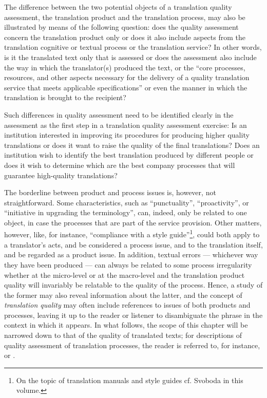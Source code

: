\documentclass[output=paper]{langsci/langscibook}
\begin{document}
The difference between the two potential objects of a translation quality assessment, the translation product and the translation process, may also be illustrated by means of the following question: does the quality assessment concern the translation product only or does it also include aspects from the translation cognitive or textual process or the translation service? In other words, is it the translated text only that is assessed or does the assessment also include the way in which the translator(s) produced the text, or the ``core processes, resources, and other aspects necessary for the delivery of a quality translation service that meets applicable specifications'' \citep{ISO2015} or even the manner in which the translation is brought to the recipient? 

Such differences in quality assessment need to be identified clearly in the assessment as the first step in a translation quality assessment exercise: Is an institution interested in improving its procedures for producing higher quality translations or does it want to raise the quality of the final translations? Does an institution wish to identify the best translation produced by different people or does it wish to determine which are the best company processes that will guarantee high-quality translations?

The borderline between product and process issues is, however, not straightforward. Some characteristics, such as ``punctuality'', ``proactivity'', or ``initiative in upgrading the terminology'', can, indeed, only be related to one object, in case the processes that are part of the service provision. Other matters, however, like, for instance, ``compliance with a style guide''\footnote{On the topic of translation manuals and style guides cf. Svoboda in this volume.}, could both apply to a translator's acts, and be considered a process issue, and to the translation itself, and be regarded as a product issue. In addition, textual errors — whichever way they have been produced — can always be related to some process irregularity whether at the micro-level or at the macro-level and the translation product quality will invariably be relatable to the quality of the process. Hence, a study of the former may also reveal information about the latter, and the concept of \textit{translation quality} may often include references to issues of both products and processes, leaving it up to the reader or listener to disambiguate the phrase in the context in which it appears. In what follows, the scope of this chapter will be narrowed down to that of the quality of translated texts; for descriptions of quality assessment of translation processes, the reader is referred to, for instance, \citet{Mertin2006} or \citet{Drugan2013}. 
\end{document}
